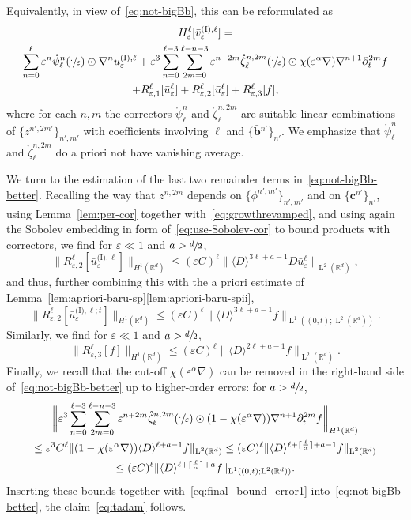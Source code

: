 \documentclass[JEP,XML,SOM,Unicode,published]{cedram}
\theoremstyle{plain}
\theoremstyle{definition}
\numberwithin{equation}{section}
\newcommand{\e}{\varepsilon}
\newcommand{\R}{\mathbb R}
\newcommand{\bb}{{\boldsymbol b}}
\newcommand{\cc}{{\boldsymbol c}}
\newcommand{\Ld}{\operatorname{L}}
\begin{document}
Equivalently, in view of~\eqref{eq:not-bigBb}, this can be reformulated as
\begin{multline}\label{eq:not-bigBb-better}
H^\ell_\e[\bar v_\e^{\text{(I)},\ell}]
=\\
\sum_{n=0}^\ell\e^{n}\mathring\psi_\ell^{n}(\sfrac{\cdot}{\e})\odot\nabla^{n}\bar{u}^{\text{(I)},\ell}_{\e}
+\e^3\sum_{n=0}^{\ell-3}\sum_{2m=0}^{\ell-n-3}\e^{n+2m}\mathring\zeta_\ell^{n,2m}(\sfrac\cdot\e)\odot\chi(\e^{\alpha}\nabla)\nabla^{n+1}\partial_t^{2m}f\\
+R^{\ell}_{\e,1}[\bar u_{\e}^{\ell}]+R^{\ell}_{\e,2}[\bar u_{\e}^{\ell}]+R^{\ell}_{\e,3}[f],
\end{multline}
{where for each $n,m$ the correctors $\mathring\psi^n_\ell$ and $\mathring\zeta^{n,2m}_\ell$ are suitable linear combinations of $\{z^{n',2m'}\}_{n',m'}$ with coefficients involving $\ell$ and $\{\bar\bb{}^{n'}\}_{n'}$.}
We emphasize that $\mathring\psi^n_\ell$ and $\mathring\zeta^{n,2m}_\ell$ do a priori not have vanishing average.

We turn to the estimation of the last two remainder terms in~\eqref{eq:not-bigBb-better}.
Recalling the way that $z^{n,2m}$ {depends on $\{\phi^{n',m'}\}_{n',m'}$ and on $\{\cc^{n'}\}_{n'}$}, using Lemma~\ref{lem:per-cor} together with~\eqref{eq:growthrevamped}, and using again the Sobolev embedding in form of~\eqref{eq:use-Sobolev-cor} to bound products with correctors, we find for $\e\ll1$ and $a>\sfrac d2$,
\begin{equation*}
\|R_{\e,2}^\ell[\bar u_\e^{\text{(I)},\ell}]\|_{H^1(\R^d)}
\le (\e C)^{\ell}\|\langle D\rangle^{3\ell+a-1}D\bar u_\e^\ell\|_{\Ld^2(\R^d)},
\end{equation*}
and thus, further combining {this} with the a priori estimate of Lemma~\ref{lem:apriori-baru-sp}\eqref{lem:apriori-baru-spii},
\[\|R_{\e,2}^\ell[\bar u_\e^{\text{(I)},\ell;t}]\|_{H^1(\R^d)}\le (\e C)^{\ell}\|\langle D\rangle^{3\ell+a-1}f\|_{\Ld^1((0,t);\Ld^2(\R^d))}.\]
Similarly, we find for $\e\ll1$ and $a>\sfrac d2$,
\[\|R_{\e,3}^\ell[f]\|_{H^1(\R^d)}\le (\e C)^{\ell}\|\langle D\rangle^{2\ell+a-1}f\|_{\Ld^2(\R^d)}.\]
Finally, we recall that the cut-off $\chi(\e^\alpha\nabla)$ can be removed in the right-hand side of~\eqref{eq:not-bigBb-better} up to higher-order errors: for $a>\sfrac d2$,
\begin{multline*}
{\bigg\|\e^3\sum_{n=0}^{\ell-3}\sum_{2m=0}^{\ell-n-3}\e^{n+2m}\mathring\zeta_\ell^{n,2m}(\sfrac\cdot\e)\odot(1-\chi(\e^{\alpha}\nabla))\nabla^{n+1}\partial_t^{2m}f\bigg\|_{H^1(\R^d)}}\\
\le \e^3C^\ell\|(1-\chi(\e^{\alpha}\nabla))\langle D\rangle^{\ell+a-1}f\|_{\Ld^2(\R^d)}
\le (\e C)^{\ell}\|\langle D\rangle^{\ell+{\lceil\frac{\ell}\alpha\rceil}+a-1}f\|_{\Ld^2(\R^d)}\\
{\le (\e C)^{\ell}\|\langle D\rangle^{\ell+{\lceil\frac{\ell}\alpha\rceil}+a}f\|_{\Ld^1((0,t);\Ld^2(\R^d))}} .
\end{multline*}
Inserting these bounds together with~\eqref{eq:final_bound_error1} into~\eqref{eq:not-bigBb-better}, the claim~\eqref{eq:tadam} follows.
\end{document}
